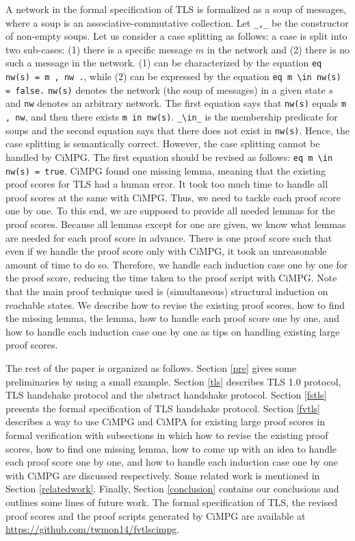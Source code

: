 \documentclass[a4paper,fleqn]{cas-dc}
\begin{document}
A network in the formal specification of TLS is formalized as a soup of messages, where a soup is an associative-commutative collection. Let \verb|_,_| be the constructor of non-empty soups. Let us consider a case splitting as follows: a case is split into two sub-cases: (1) there is a specific message $m$ in the network and (2) there is no such a message in the network. (1) can be characterized by the equation \verb!eq nw(s) = m , nw .!, while (2) can be expressed by the equation \verb!eq m \in nw(s) = false.! \verb!nw(s)! denotes the network (the soup of messages) in a given state $s$ and \verb!nw! denotes an arbitrary network. The first equation says that \verb!nw(s)! equals \verb!m , nw!, and then there exists \verb!m in nw(s)!. \verb|_\in_| is the membership predicate for soups and the second equation says that there does not exist in \verb!nw(s)!. Hence, the case splitting is semantically correct. However, the case splitting cannot be handled by CiMPG. The first equation should be revised as follows: 
\verb!eq m \in nw(s) = true!. CiMPG found one missing lemma, meaning that the existing proof scores for TLS had a human error. It took too much time to handle all proof scores at the same with CiMPG. Thus, we need to tackle each proof score one by one. To this end, we are supposed to provide all needed lemmas for the proof scores. Because all lemmas except for one are given, we know what lemmas are needed for each proof score in advance. There is one proof score such that even if we handle the proof score only with CiMPG, it took an unreasonable amount of time to do so. Therefore, we handle each induction case one by one for the proof score, reducing the time taken to the proof script with CiMPG. Note that the main proof technique used is (simultaneous) structural induction on reachable states. We describe how to revise the existing proof scores, how to find the missing lemma, the lemma, how to handle each proof score one by one, and how to handle each induction case one by one as tips on handling existing large proof scores.


The rest of the paper is organized as follows. Section \ref{pre} gives some preliminaries by using a small example. Section \ref{tls} describes TLS 1.0 protocol, TLS handshake protocol and the abstract handshake protocol. Section \ref{fstls} presents the formal specification of TLS handshake protocol. Section \ref{fvtls} describes a way to use CiMPG and CiMPA for existing large proof scores in formal verification with subsections in which how to revise the existing proof scores, how to find one missing lemma, how to come up with an idea to handle each proof score one by one, and how to handle each induction case one by one with CiMPG are discussed respectively. Some related work is mentioned in Section \ref{relatedwork}. Finally, Section \ref{conclusion} contains our
conclusions and outlines some lines of future work. The formal specification of TLS, the revised proof scores and the proof scripts generated by CiMPG are available at \url{ https://github.com/twmon14/fvtlscimpg}.
\end{document}
